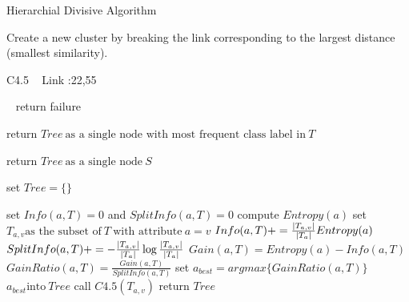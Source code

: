 \documentclass[a4paper]{article}
\begin{document}
\begin{algorithm}
   \caption{Hierarchial Divisive Algorithm ~\cite{hda1} }
    \begin{algorithmic}[1]
     
       
     \State Create a new cluster by breaking the link corresponding to the largest distance (smallest
similarity).

   \EndWhile



\end{algorithmic}
\end{algorithm}

 \begin{algorithm}
 
   \caption{C4.5  ~\cite{c4.5} Link :22,55 }
    \begin{algorithmic}[1]
     \
      \State return failure
      \EndIf
      
      \State return $Tree \  \text{as a single node with most frequent class label in}\  T$ 
      \EndIf
     
      \State return $Tree \  \text{as a single node}\  S $ 
      \EndIf
      
   \State set $Tree = \{\}$
   
       \State set $Info(a,T) = 0$  and $SplitInfo(a,T) = 0$
       \State compute $Entropy(a)$
       \State set $T_{a,v}  \text{as the subset of} \  T \  \text{with attribute}\ a = v$  
       \State  $Info(a,T) + = \frac{\abs{T_{a,v}}}{\abs{T_{a}}} Entropy(a)$
       \State $SplitInfo(a,T)+= - \frac{\abs{T_{a,v}}}{\abs{T_{a}}} \log \frac{\abs{T_{a,v}}}{\abs{T_{a}}} $
          \EndFor
          \State $Gain(a,T) = Entropy(a) - Info(a,T)$
          \State  $GainRatio(a,T) = \frac{Gain(a,T)}{SplitInfo(a,T)}$
          \EndFor
       \State set $a_{best} = argmax \{GainRatio(a,T)\}$
       \State $a_{best} \text{into} \  Tree$
       call $C4.5(T_{a,v})$
        \EndFor
        \State return $Tree$
        
  \EndFunction
  

\end{algorithmic}
\end{algorithm}
\end{document}
